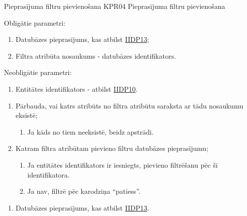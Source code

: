 \procedureTable
{Pieprasījuma filtru pievienošana}
{KPR04}
{
	Pieprasījuma filtru pievienošana
}
{
	Obligātie parametri:
	\begin{enumerate}
		\item Datubāzes pieprasījums, kas atbilst \hyperref[tab:IIDP13]{IIDP13};
		\item Filtra atribūta nosaukums - datubāzes identifikators.
	\end{enumerate}

	Neobligātie parametri:
	\begin{enumerate}
		\item Entitātes identifikators - atbilst \hyperref[tab:IIDP10]{IIDP10}.
	\end{enumerate}

}
{
	\begin{enumerate}
		\item Pārbauda, vai katrs atribūts no filtra atribūtu saraksta ar tādu nosaukumu eksistē;
		      \begin{enumerate}
			      \item Ja kāds no tiem neeksistē, beidz apstrādi.
		      \end{enumerate}
		\item Katram filtra atribūtam pievieno filtru datubāzes pieprasījumu;
		      \begin{enumerate}
			      \item Ja entitātes identifikators ir iesniegts, pievieno filtrēšanu pēc šī identifikatora.
			      \item Ja nav, filtrē pēc karodziņa ``patiess''.
		      \end{enumerate}
	\end{enumerate}
}
{
	\begin{enumerate}
		\item Datubāzes pieprasījums, kas atbilst \hyperref[tab:IIDP13]{IIDP13}.
	\end{enumerate}
}
